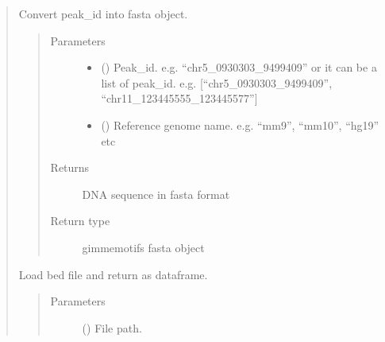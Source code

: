 \documentclass[letterpaper,10pt,english]{sphinxmanual}
\begin{document}
\begin{quote}

\begin{fulllineitems}
\label{\detokenize{modules/celloracle.motif_analysis:celloracle.motif_analysis.peak2fasta}}
Convert peak\_id into fasta object.
\begin{quote}\begin{description}
\item[{Parameters}] \leavevmode\begin{itemize}
\item {} 
 () \textendash{} Peak\_id.  e.g. “chr5\_0930303\_9499409”
or it can be a list of peak\_id.  e.g. {[}“chr5\_0930303\_9499409”, “chr11\_123445555\_123445577”{]}

\item {} 
 () \textendash{} Reference genome name.   e.g. “mm9”, “mm10”, “hg19” etc

\end{itemize}

\item[{Returns}] \leavevmode
DNA sequence in fasta format

\item[{Return type}] \leavevmode
gimmemotifs fasta object

\end{description}\end{quote}

\end{fulllineitems}


\begin{fulllineitems}
\label{\detokenize{modules/celloracle.motif_analysis:celloracle.motif_analysis.read_bed}}
Load bed file and return as dataframe.
\begin{quote}\begin{description}
\item[{Parameters}] \leavevmode
{} () \textendash{} File path.


\end{description}
\end{quote}
\end{fulllineitems}
\end{quote}
\end{document}
